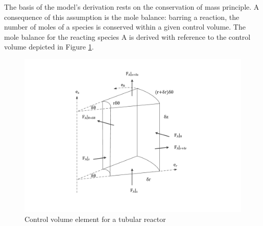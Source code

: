 \documentclass[11pt,fleqn]{article}
\theoremstyle{defstyle}
\begin{document}
The basis of the model's derivation rests on the conservation of mass principle. A consequence of this assumption is the mole balance: barring a reaction, the number of moles of a species is conserved within a given control volume. The mole balance for the reacting species A is derived with reference to the control volume depicted in Figure \ref{fig_vol_element}.

\begin{figure}[H] 
\centering
\includegraphics[scale=0.5]{volume_element}
\caption{Control volume element for a tubular reactor} 
\label{fig_vol_element}
\end{figure}
\end{document}

